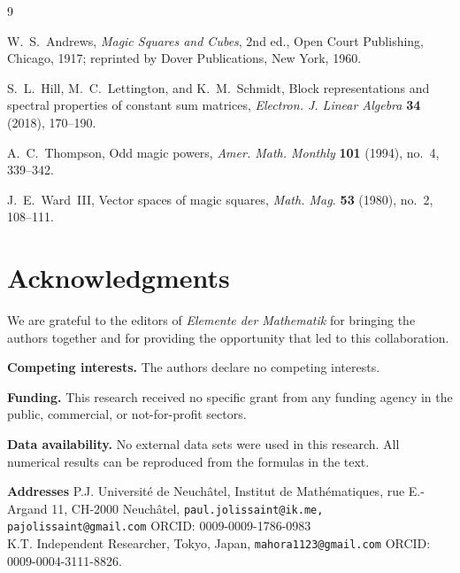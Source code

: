 \documentclass[a4paper,11pt]{article}
\theoremstyle{plain}
\theoremstyle{definition}
\theoremstyle{remark}
\begin{document}
%
%



\renewcommand{\refname}{References}
\begin{thebibliography}{9}

W.~S.~Andrews,
\emph{Magic Squares and Cubes},
2nd ed., Open Court Publishing, Chicago, 1917;
reprinted by Dover Publications, New York, 1960.

S.~L.~Hill, M.~C.~Lettington, and K.~M.~Schmidt,
Block representations and spectral properties of constant sum matrices,
\emph{Electron. J. Linear Algebra} \textbf{34} (2018), 170--190.

A.~C.~Thompson,
Odd magic powers,
\emph{Amer. Math. Monthly} \textbf{101} (1994), no.~4,
339--342.

J.~E.~Ward~III,
Vector spaces of magic squares,
\emph{Math. Mag.} \textbf{53} (1980), no.~2, 108--111.

\end{thebibliography}

\bigskip
\section*{Acknowledgments}
We are grateful to the editors of \emph{Elemente der Mathematik} for bringing the authors together and for providing the opportunity that led to this collaboration.

\medskip
\noindent\textbf{Competing interests.}
The authors declare no competing interests.

\medskip
\noindent\textbf{Funding.}
This research received no specific grant from any funding agency
in the public, commercial, or not-for-profit sectors.

\medskip
\noindent\textbf{Data availability.}
No external data sets were used in this research. All numerical results
can be reproduced from the formulas in the text.


\medskip\noindent
\textbf{Addresses}
P.J. Universit\'e de Neuch\^atel, Institut de Math\'ematiques, rue E.-Argand 11, CH-2000 Neuch\^atel, \texttt{paul.jolissaint@ik.me, pajolissaint@gmail.com}
ORCID: 0009-0009-1786-0983\\
K.T. Independent Researcher, Tokyo, Japan, \texttt{mahora1123@gmail.com} ORCID: 0009-0004-3111-8826.
\end{document}
